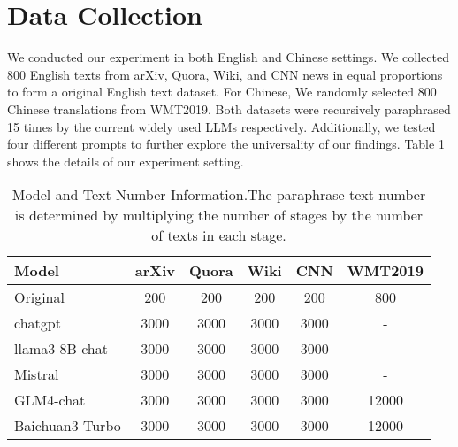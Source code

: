 \section{Data Collection}
We conducted our experiment in both English and Chinese settings. 
We collected 800 English texts from arXiv, Quora, Wiki, and CNN news in equal proportions to form a original English text dataset.
For Chinese, We randomly selected 800 Chinese translations from WMT2019.
Both datasets were recursively paraphrased 15 times by the current widely used LLMs respectively. 
Additionally, we tested four different prompts to further explore the universality of our findings.
Table 1 shows the details of our experiment setting.
\begin{table*}[h!]
\centering
\begin{tabular}{lccccc}
\toprule
\textbf{Model} & \textbf{arXiv} & \textbf{Quora} & \textbf{Wiki} & \textbf{CNN} & \textbf{WMT2019} \\
\midrule
Original & 200 & 200 & 200 & 200 & 800 \\
chatgpt & 3000 & 3000 & 3000 & 3000 &- \\
llama3-8B-chat & 3000 & 3000 & 3000 & 3000 &- \\
Mistral & 3000 & 3000 & 3000 & 3000 &- \\
GLM4-chat & 3000 & 3000 & 3000 & 3000 & 12000 \\
Baichuan3-Turbo & 3000 & 3000 & 3000 & 3000 & 12000 \\
\bottomrule
\end{tabular}
\caption{Model and Text Number Information.The paraphrase text number is determined by multiplying the number of stages by the number of texts in each stage. }
\label{table:model_text_number_info}
\end{table*}
